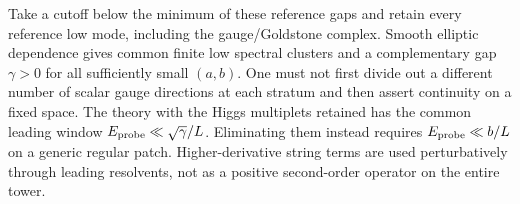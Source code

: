 Take a cutoff below the minimum of these reference gaps and retain
every reference low mode, including the gauge/Goldstone complex.
Smooth elliptic dependence gives common finite low spectral clusters
and a complementary gap $\gamma>0$ for all sufficiently small
$(a,b)$. One must not first divide out a different number of scalar
gauge directions at each stratum and then assert continuity on a
fixed space. The theory with the Higgs multiplets retained has the
common leading window $E_{\rm probe}\ll\sqrt\gamma/L$.
Eliminating them instead requires $E_{\rm probe}\ll b/L$ on a
generic regular patch. Higher-derivative string terms are used
perturbatively through leading resolvents, not as a positive
second-order operator on the entire tower.
